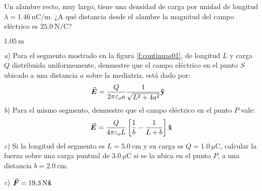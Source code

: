 \setcounter{figure}{0}

\begin{Exercise}
  Un alambre recto, muy largo, tiene una densidad de carga por unidad de longitud $\lambda = \SI{1.46}{\nano\coulomb/\metre}$. ¿A qué distancia desde el alambre la magnitud del campo eléctrico es $\SI{25.0}{\newton/\coulomb}$?
\end{Exercise}
\begin{Answer}
  $\SI{1.05}{\metre}$
\end{Answer}
%
\begin{Exercise}\label{p:continuas01}
  \textbf{\raisebox{.5pt}{\textcircled{\raisebox{-1.2pt} {E}}}} \textit{a}) Para el segmento mostrado en la figura \ref{f:continuas01}, de longitud $L$ y carga $Q$ distribuida uniformemente, demuestre que el campo eléctrico en el punto $S$ ubicado a una distancia $a$ sobre la mediatriz, está dado por:
  \begin{align*}
    \va*{E} &= \frac{Q}{2\pi\varepsilon_o a} \frac{1}{\sqrt{L^2+4a^2}}\vu{y}
  \end{align*}
  \textit{b}) Para el mismo segmento, demuestre que el campo eléctrico en el punto $P$ vale:
  \begin{align*}
    \va*{E} = \frac{Q}{4\pi\varepsilon_o L} \left \lbrack \frac{1}{b} - \frac{1}{L+b} \right \rbrack \vu{x}
  \end{align*}
  \textit{c}) Si la longitud del segmento es $L = \SI{5.0}{\centi\metre}$ y su carga es $Q = \SI{1.0}{\micro\coulomb}$, calcular la fuerza sobre una carga puntual de $\SI{3.0}{\micro\coulomb}$ si se la ubica en el punto $P$, a una distancia $b = \SI{2.0}{\centi\metre}$.
\end{Exercise}
\begin{Answer}
  \textit{c}) $\va*{F} = \SI{19.3}{\newton}\vu{x}$
\end{Answer}
%
\begin{center}
\end{center}
